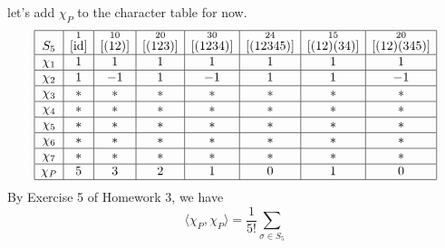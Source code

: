 \begin{exmp}{}
    let's add $\chi_P$ to the character table for now. 
    \begin{align*}
        \begin{array}{|c|c|c|c|c|c|c|c|}
            \hline
            S_5    & \overset{1}{[\operatorname{id}]} & \overset{10}{[(12)]} & \overset{20}{[(123)]} & \overset{30}{[(1234)]} & \overset{24}{[(12345)]} & \overset{15}{[(12)(34)]} & \overset{20}{[(12)(345)]} \\ \hline
            \chi_1 & 1                  & 1                    & 1                     & 1                      & 1                       & 1                        & 1                         \\ \hline
            \chi_2 & 1                  & -1                   & 1                     & -1                     & 1                       & 1                        & -1                        \\ \hline
            \chi_3 & *                  & *                    & *                     & *                      & *                       & *                        & *                         \\ \hline
            \chi_4 & *                  & *                    & *                     & *                      & *                       & *                        & *                         \\ \hline
            \chi_5 & *                  & *                    & *                     & *                      & *                       & *                        & *                         \\ \hline
            \chi_6 & *                  & *                    & *                     & *                      & *                       & *                        & *                         \\ \hline
            \chi_7 & *                  & *                    & *                     & *                      & *                       & *                        & *                         \\ \hline
            \chi_P & 5                  & 3                    & 2                     & 1                      & 0                       & 1                        & 0                         \\ \hline 
        \end{array} 
    \end{align*}
    By Exercise 5 of Homework 3, we have 
    \[ \langle \chi_P, \chi_P \rangle = \frac1{5!} \sum_{\sigma \in S_5} 
\]
\end{exmp}
